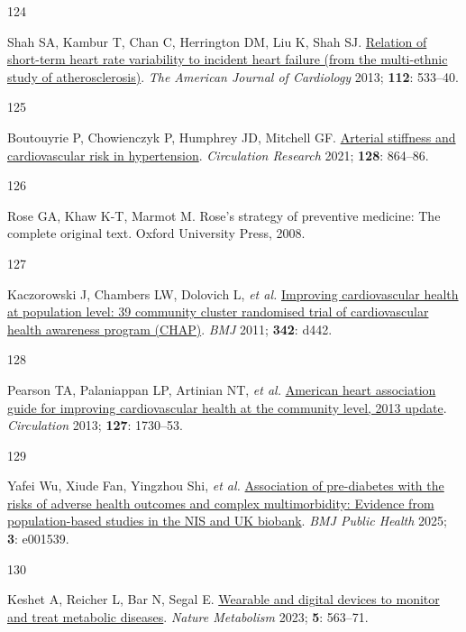\documentclass[
  letterpaper,
  headsepline=true,
  open=any]{scrbook}
\newlength{\cslhangindent}
\newlength{\csllabelwidth}
\newlength{\cslentryspacingunit} %
\newenvironment{CSLReferences}[2] %
 {%
  \setlength{\parindent}{0pt}
  \ifodd #1
  \let\oldpar\par
  \def\par{\hangindent=\cslhangindent\oldpar}
  \fi
  \setlength{\parskip}{#2\cslentryspacingunit}
 }%
 {}
\newcommand{\CSLLeftMargin}[1]{\parbox[t]{\csllabelwidth}{#1}}
\newcommand{\CSLRightInline}[1]{\parbox[t]{\linewidth - \csllabelwidth}{#1}\break}
\begin{document}
\begin{CSLReferences}{0}{0}
\leavevmode{}%
\CSLLeftMargin{124 }%
\CSLRightInline{Shah SA, Kambur T, Chan C, Herrington DM, Liu K, Shah
SJ. \href{https://doi.org/10.1016/j.amjcard.2013.04.018}{Relation of
short-term heart rate variability to incident heart failure (from the
multi-ethnic study of atherosclerosis)}. \emph{The American Journal of
Cardiology} 2013; \textbf{112}: 533--40.}

\leavevmode{}%
\CSLLeftMargin{125 }%
\CSLRightInline{Boutouyrie P, Chowienczyk P, Humphrey JD, Mitchell GF.
\href{https://doi.org/10.1161/CIRCRESAHA.121.318061}{Arterial stiffness
and cardiovascular risk in hypertension}. \emph{Circulation Research}
2021; \textbf{128}: 864--86.}

\leavevmode{}%
\CSLLeftMargin{126 }%
\CSLRightInline{Rose GA, Khaw K-T, Marmot M. Rose's strategy of
preventive medicine: The complete original text. Oxford University
Press, 2008.}

\leavevmode{}%
\CSLLeftMargin{127 }%
\CSLRightInline{Kaczorowski J, Chambers LW, Dolovich L, \emph{et al.}
\href{https://doi.org/10.1136/bmj.d442}{Improving cardiovascular health
at population level: 39 community cluster randomised trial of
cardiovascular health awareness program (CHAP)}. \emph{BMJ} 2011;
\textbf{342}: d442.}

\leavevmode{}%
\CSLLeftMargin{128 }%
\CSLRightInline{Pearson TA, Palaniappan LP, Artinian NT, \emph{et al.}
\href{https://doi.org/10.1161/CIR.0b013e31828f8a94}{American heart
association guide for improving cardiovascular health at the community
level, 2013 update}. \emph{Circulation} 2013; \textbf{127}: 1730--53.}

\leavevmode{}%
\CSLLeftMargin{129 }%
\CSLRightInline{Yafei Wu, Xiude Fan, Yingzhou Shi, \emph{et al.}
\href{https://doi.org/10.1136/bmjph-2024-001539}{Association of
pre-diabetes with the risks of adverse health outcomes and complex
multimorbidity: Evidence from population-based studies in the NIS and UK
biobank}. \emph{BMJ Public Health} 2025; \textbf{3}: e001539.}

\leavevmode{}%
\CSLLeftMargin{130 }%
\CSLRightInline{Keshet A, Reicher L, Bar N, Segal E.
\href{https://doi.org/10.1038/s42255-023-00778-y}{Wearable and digital
devices to monitor and treat metabolic diseases}. \emph{Nature
Metabolism} 2023; \textbf{5}: 563--71.}


\end{CSLReferences}
\end{document}
